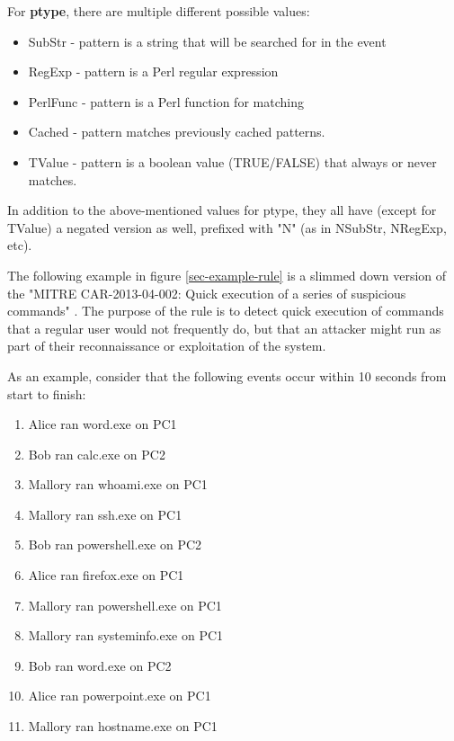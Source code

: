 For \textbf{ptype}, there are multiple different possible values:

\begin{itemize}
    \item SubStr - pattern is a string that will be searched for in the event
    \item RegExp - pattern is a Perl regular expression
    \item PerlFunc - pattern is a Perl function for matching
    \item Cached - pattern matches previously cached patterns.
    \item TValue - pattern is a boolean value (TRUE/FALSE) that always or never matches.
\end{itemize}

In addition to the above-mentioned values for ptype, they all have (except for TValue) a negated version as well, prefixed with "N" (as in NSubStr, NRegExp, etc).

The following example in figure \cref{sec-example-rule} is a slimmed down version of the "MITRE CAR-2013-04-002: Quick execution of a series of suspicious commands" \cite{CAR2013057:online}. The purpose of the rule is to detect quick execution of commands that a regular user would not frequently do, but that an attacker might run as part of their reconnaissance or exploitation of the system.

As an example, consider that the following events occur within 10 seconds from start to finish:

\begin{enumerate}
    \item \colorbox{blue!30}{Alice ran word.exe on PC1}
    \item \colorbox{green!30}{Bob ran calc.exe on PC2}
    \item \colorbox{red!30}{Mallory ran whoami.exe on PC1}
    \item \colorbox{red!30}{Mallory ran ssh.exe on PC1}
    \item \colorbox{green!30}{Bob ran powershell.exe on PC2}
    \item \colorbox{blue!30}{Alice ran firefox.exe on PC1}
    \item \colorbox{red!30}{Mallory ran powershell.exe on PC1}
    \item \colorbox{red!30}{Mallory ran systeminfo.exe on PC1}
    \item \colorbox{green!30}{Bob ran word.exe on PC2}
    \item \colorbox{blue!30}{Alice ran powerpoint.exe on PC1}
    \item \colorbox{red!30}{Mallory ran hostname.exe on PC1}
\end{enumerate}

